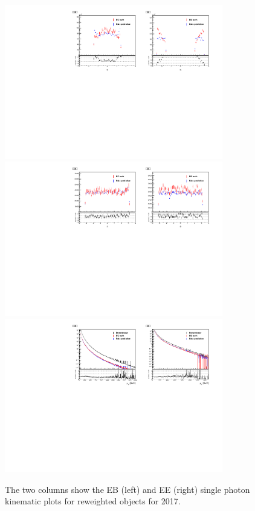 \begin{figure}[!htbp]
\centering
\includegraphics[width=0.85\textwidth]{fig/closure_test_photon_kinematics_eta_2017sans_Denom.pdf}\\
\includegraphics[width=0.85\textwidth]{fig/closure_test_photon_kinematics_phi_2017sans_Denom.pdf}\\
\includegraphics[width=0.85\textwidth]{fig/closure_test_photon_kinematics_pt_2017.pdf}
\caption{The two columns show the EB (left) and EE (right) single photon kinematic plots for reweighted objects for 2017.}
\label{fig:kinematics17}
\end{figure}


